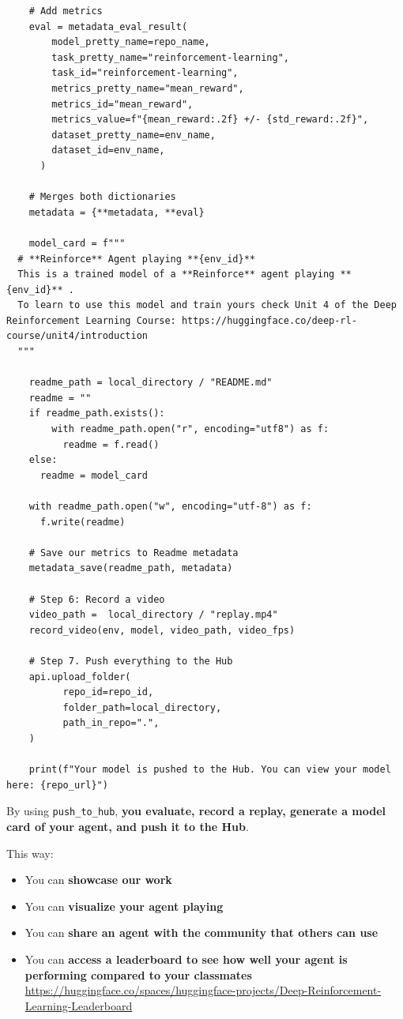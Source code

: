 \documentclass[11pt,a4paper]{article}
\begin{document}
\begin{lstlisting}
    # Add metrics
    eval = metadata_eval_result(
        model_pretty_name=repo_name,
        task_pretty_name="reinforcement-learning",
        task_id="reinforcement-learning",
        metrics_pretty_name="mean_reward",
        metrics_id="mean_reward",
        metrics_value=f"{mean_reward:.2f} +/- {std_reward:.2f}",
        dataset_pretty_name=env_name,
        dataset_id=env_name,
      )

    # Merges both dictionaries
    metadata = {**metadata, **eval}

    model_card = f"""
  # **Reinforce** Agent playing **{env_id}**
  This is a trained model of a **Reinforce** agent playing **{env_id}** .
  To learn to use this model and train yours check Unit 4 of the Deep Reinforcement Learning Course: https://huggingface.co/deep-rl-course/unit4/introduction
  """

    readme_path = local_directory / "README.md"
    readme = ""
    if readme_path.exists():
        with readme_path.open("r", encoding="utf8") as f:
          readme = f.read()
    else:
      readme = model_card

    with readme_path.open("w", encoding="utf-8") as f:
      f.write(readme)

    # Save our metrics to Readme metadata
    metadata_save(readme_path, metadata)

    # Step 6: Record a video
    video_path =  local_directory / "replay.mp4"
    record_video(env, model, video_path, video_fps)

    # Step 7. Push everything to the Hub
    api.upload_folder(
          repo_id=repo_id,
          folder_path=local_directory,
          path_in_repo=".",
    )

    print(f"Your model is pushed to the Hub. You can view your model here: {repo_url}")
\end{lstlisting}

By using \texttt{push\_to\_hub}, \textbf{you evaluate, record a replay, generate a model card of your agent, and push it to the Hub}.

This way:

\begin{itemize}
\tightlist
\item
  You can \textbf{showcase our work}
\item
  You can \textbf{visualize your agent playing}
\item
  You can \textbf{share an agent with the community that others can use}
\item
  You can \textbf{access a leaderboard to see how well your agent is performing compared to your classmates} \url{https://huggingface.co/spaces/huggingface-projects/Deep-Reinforcement-Learning-Leaderboard}
\end{itemize}
\end{document}
